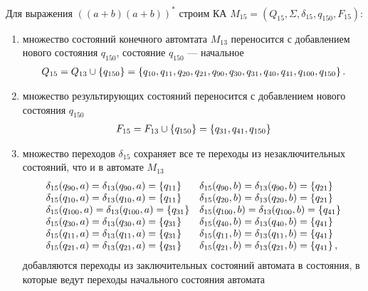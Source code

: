 \newpage
Для выражения \(((a+b)(a+b))^*\) строим КА \(M_{15}=(Q_{15}, \Sigma, \delta_{15}, q_{150}, F_{15})\):
\begin{enumerate}
	\item множество состояний конечного автомтата \(M_{13}\) переносится с добавлением нового состояния \(q_{150}\), состояние \(q_{150}\) --- начальное
	      \begin{align*}
		      Q_{15} = Q_{13} \cup \left\{ q_{150}\right\} = \left\{q_{10}, q_{11}, q_{20}, q_{21}, q_{90},q_{30}, q_{31}, q_{40}, q_{41}, q_{100}, q_{150} \right\}.
	      \end{align*}
	\item множество результирующих состояний переносится с добавлением нового состояния \(q_{150}\)
	      \begin{align*}
		      F_{15} = F_{13} \cup \left\{q_{150}\right\} = \left\{q_{31}, q_{41}, q_{150}\right\}
	      \end{align*}
	\item множество переходов  \(\delta_{15}\) сохраняет все те переходы из незаключительных состояний, что и в автомате \(M_{13}\)
	      \begin{align*}
		      \begin{array}{ll}
			      \delta_{15}(q_{90}, a)  = \delta_{13}(q_{90}, a) = \left\{q_{11}\right\} & \delta_{15}(q_{90}, b)  =  \delta_{13}(q_{90}, b) = \left\{q_{21}\right\} \\
			      \delta_{15}(q_{10}, a)  = \delta_{13}(q_{10}, a) = \left\{q_{11}\right\} & \delta_{15}(q_{20}, b)  = \delta_{13}(q_{20}, b) = \left\{q_{21}\right\}  \\
			      \delta_{15}(q_{100}, a)= \delta_{13}(q_{100}, a) = \left\{q_{31}\right\} & \delta_{15}(q_{100}, b) =\delta_{13}(q_{100}, b) = \left\{q_{41}\right\}  \\
			      \delta_{15}(q_{30}, a) = \delta_{13}(q_{30}, a) = \left\{q_{31}\right\}  & \delta_{15}(q_{40}, b)  =\delta_{13}(q_{40}, b) = \left\{q_{41}\right\}   \\
			      \delta_{15}(q_{11}, a) =\delta_{13}(q_{11}, a)  =  \left\{q_{31}\right\} & \delta_{15}(q_{11}, b)=\delta_{13}(q_{11}, b)  =  \left\{q_{41}\right\}   \\
			      \delta_{15}(q_{21}, a) =\delta_{13}(q_{21}, a)  =  \left\{q_{31}\right\} & \delta_{15}(q_{21}, b)=\delta_{13}(q_{21}, b)  =  \left\{q_{41}\right\},
		      \end{array}
	      \end{align*}
	      добавляются переходы из заключительных состояний автомата в состояния, в которые ведут переходы начального состояния автомата
	      \begin{align*}

\end{align*}
\end{enumerate}
